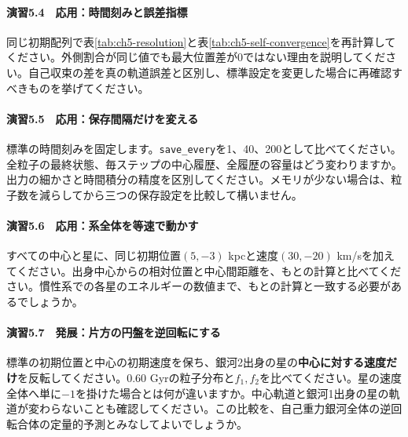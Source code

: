 \paragraph{演習5.4　応用：時間刻みと誤差指標}
同じ初期配列で表\ref{tab:ch5-resolution}と表\ref{tab:ch5-self-convergence}を再計算してください。外側割合が同じ値でも最大位置差が0ではない理由を説明してください。自己収束の差を真の軌道誤差と区別し、標準設定を変更した場合に再確認すべきものを挙げてください。

\paragraph{演習5.5　応用：保存間隔だけを変える}
標準の時間刻みを固定します。\texttt{save\_every}を1、40、200として比べてください。全粒子の最終状態、毎ステップの中心履歴、全履歴の容量はどう変わりますか。出力の細かさと時間積分の精度を区別してください。メモリが少ない場合は、粒子数を減らしてから三つの保存設定を比較して構いません。

\paragraph{演習5.6　応用：系全体を等速で動かす}
すべての中心と星に、同じ初期位置$(5,-3)$ kpcと速度$(30,-20)$ km/sを加えてください。出身中心からの相対位置と中心間距離を、もとの計算と比べてください。慣性系での各星のエネルギーの数値まで、もとの計算と一致する必要があるでしょうか。

\paragraph{演習5.7　発展：片方の円盤を逆回転にする}
標準の初期位置と中心の初期速度を保ち、銀河2出身の星の\textbf{中心に対する速度だけ}を反転してください。0.60 Gyrの粒子分布と$f_1,f_2$を比べてください。星の速度全体へ単に$-1$を掛けた場合とは何が違いますか。中心軌道と銀河1出身の星の軌道が変わらないことも確認してください。この比較を、自己重力銀河全体の逆回転合体の定量的予測とみなしてよいでしょうか。
